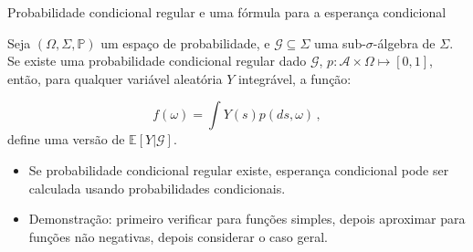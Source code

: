 \documentclass[11pt]{beamer}
\begin{document}
\begin{frame}{Probabilidade condicional regular e uma fórmula para a esperança condicional}
\begin{lemma}
	Seja $(\Omega, \Sigma,\mathbb{P})$ um espaço de probabilidade, e $\mathcal{G}\subseteq \Sigma$ uma sub-$\sigma$-álgebra de $\Sigma$. Se existe uma probabilidade condicional regular dado $\mathcal{G}$, $p:\mathcal{A}\times \Omega \mapsto {[0,1]}$, então, para qualquer variável aleatória $Y$ integrável, a função:
	
	$$f(\omega) = \int Y(s) p(ds, \omega)\, , $$
	define uma versão de $\mathbb{E}[Y|\mathcal{G}]$.
\end{lemma}
\begin{itemize}
	\item Se probabilidade condicional regular existe, esperança condicional pode ser calculada usando probabilidades condicionais.
	\item Demonstração: primeiro verificar para funções simples, depois aproximar para funções não negativas, depois considerar o caso geral.
\end{itemize}
\end{frame}
\end{document}
